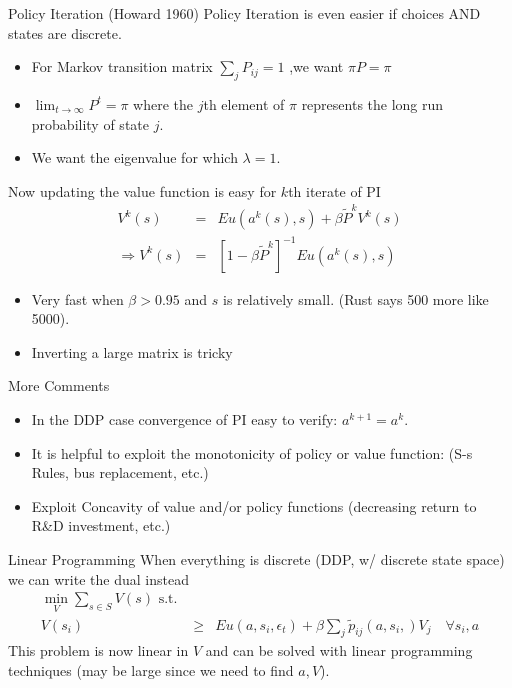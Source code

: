 \documentclass[xcolor=pdftex,dvipsnames,table,mathserif,aspectratio=169]{beamer}
\begin{document}
\begin{frame}{Policy Iteration (Howard 1960)}
Policy Iteration is even easier if choices AND states are discrete.
\begin{itemize}
\item For Markov transition matrix $\sum_j P_{ij} =1$ ,we want $\pi P = \pi$
\item $\lim_{t \rightarrow \infty} P^t = \pi$ where the $j$th element of $\pi$ represents the long run probability of state $j$.
\item We want the eigenvalue for which $\lambda = 1$.
\end{itemize}
Now updating the value function is easy for $k$th iterate of PI
\begin{eqnarray*}
V^k(s) &=& Eu(a^k(s),s) + \beta \tilde{P}^k V^k(s)\\
\Rightarrow V^k(s) &=& [1 - \beta \tilde{P}^k]^{-1} Eu(a^k(s),s)
\end{eqnarray*}
\vspace{-1cm}
\begin{itemize}
\item Very fast when $\beta > 0.95$ and $s$ is relatively small. (Rust says 500 more like 5000).
\item Inverting a large matrix is tricky
\end{itemize}
\end{frame}


\begin{frame}{More Comments }
\begin{itemize}
\item In the DDP case convergence of PI easy to verify: $a^{k+1} = a^k$.
\item It is helpful to exploit the monotonicity of policy or value function: (S-s Rules, bus replacement, etc.)
\item Exploit Concavity of value and/or policy functions (decreasing return to R\&D investment, etc.) 
\end{itemize}
\end{frame}


\begin{frame}{Linear Programming}
When everything is discrete (DDP, w/ discrete state space) we can write the dual instead
\begin{eqnarray*}
\min_{V} \sum_{s \in S} V(s) \mbox{ s.t. }&& \\
V(s_i) &\geq& Eu(a,s_i,\epsilon_t)  + \beta \sum_j \tilde{p}_{ij}(a,s_i,) V_j \quad \forall s_i, a
\end{eqnarray*}
This problem is now linear in $V$ and can be solved with linear programming techniques (may be large since we need to find $a,V$).
\end{frame}
\end{document}
